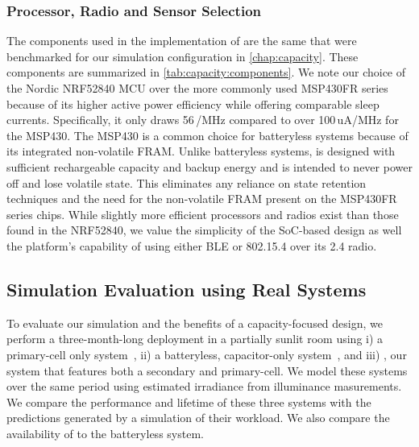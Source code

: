 \subsubsection{Processor, Radio and Sensor Selection}
The components used in the implementation of \name are the same that were benchmarked for our simulation configuration in \cref{chap:capacity}.
These components are summarized in \cref{tab:capacity:components}.
We note our choice of the Nordic NRF52840 MCU over the more commonly used MSP430FR series
because of its higher active power efficiency while offering comparable sleep currents.
Specifically, it only draws 56\,\uA/MHz compared to over 100\,uA/MHz
for the MSP430.
The MSP430 is a common choice for batteryless systems because of its integrated non-volatile FRAM. 
Unlike batteryless systems,
\name is designed with sufficient rechargeable capacity and backup energy and is intended to never power off and lose volatile state. 
This eliminates any reliance on state retention techniques and the need for the non-volatile FRAM present on the MSP430FR series chips. 
While
slightly more efficient
processors and radios exist than those found in the NRF52840,
we value the simplicity of the SoC-based design as well the platform's capability of using either BLE or 802.15.4 over its 2.4\ssi{\giga\hertz} radio.  

\subsection{Simulation Evaluation using Real Systems}
\label{sec:eval}
To evaluate our simulation and the benefits of a capacity-focused design, 
we perform a three-month-long deployment in a partially sunlit room
using i) a primary-cell only system~\cite{adkins2015michigan}, ii) a batteryless, capacitor-only system~\cite{campbellEnergy14}, and iii) \name, our
system that features both a secondary and primary-cell. 
We model these
systems over the same period using estimated irradiance from \name illuminance masurements. 
We compare the performance and lifetime of these three systems with the predictions generated by a simulation of their workload. 
We also compare the availability of \name to the batteryless system.


